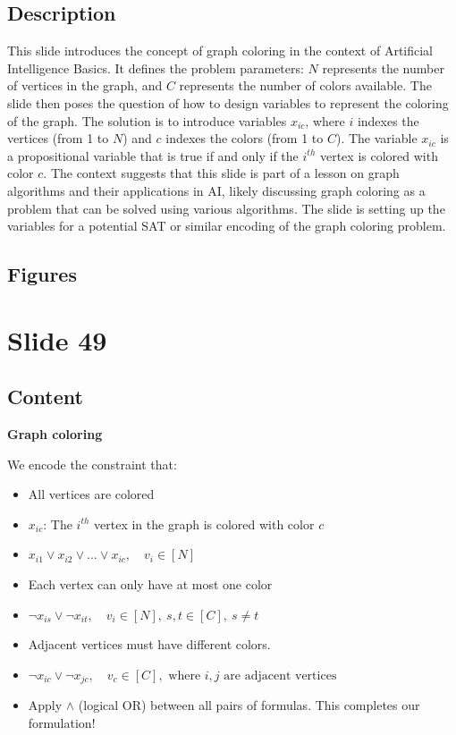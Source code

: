 \documentclass{article}%
\begin{document}
\subsection{Description}%
This slide introduces the concept of graph coloring in the context of Artificial Intelligence Basics.  It defines the problem parameters:  $N$ represents the number of vertices in the graph, and $C$ represents the number of colors available.  The slide then poses the question of how to design variables to represent the coloring of the graph.  The solution is to introduce variables $x_{ic}$, where $i$ indexes the vertices (from 1 to $N$) and $c$ indexes the colors (from 1 to $C$).  The variable $x_{ic}$ is a propositional variable that is true if and only if the $i^{th}$ vertex is colored with color $c$.  The context suggests that this slide is part of a lesson on graph algorithms and their applications in AI, likely discussing graph coloring as a problem that can be solved using various algorithms.  The slide is setting up the variables for a potential SAT or similar encoding of the graph coloring problem.%
\subsection{Figures}%
\begin{figure}[H]%
\centering%
\end{figure}

%
\newpage%
\section{Slide 49}%
\label{sec:Slide49}%
\subsection{Content}%

\textbf{Graph coloring}

We encode the constraint that:
\begin{itemize}
    \item All vertices are colored
    \item $x_{ic}$: The $i^{th}$ vertex in the graph is colored with color $c$
    \item $x_{i1} \lor x_{i2} \lor \dots \lor x_{ic}, \quad v_i \in [N]$
    \item Each vertex can only have at most one color
    \item $\neg x_{is} \lor \neg x_{it}, \quad v_i \in [N], \ s,t \in [C], \ s \neq t$
    \item Adjacent vertices must have different colors.
    \item $\neg x_{ic} \lor \neg x_{jc}, \quad v_c \in [C], \text{ where } i, j \text{ are adjacent vertices}$
    \item Apply $\land$ (logical OR) between all pairs of formulas. This completes our formulation!
\end{itemize}
%
\end{document}
